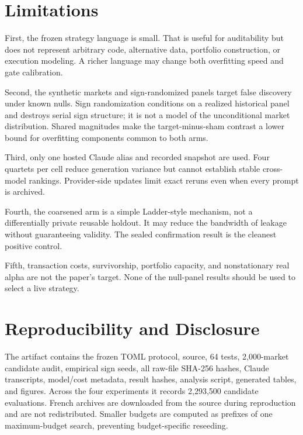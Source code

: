 \documentclass[sigconf,nonacm]{acmart}
\begin{document}
\section{Limitations}

First, the frozen strategy language is small. That is useful for auditability
but does not represent arbitrary code, alternative data, portfolio construction,
or execution modeling. A richer language may change both overfitting speed and
gate calibration.

Second, the synthetic markets and sign-randomized panels target false discovery
under known nulls. Sign randomization conditions on a realized historical panel
and destroys serial sign structure; it is not a model of the unconditional
market distribution. Shared magnitudes make the target-minus-sham contrast a
lower bound for overfitting components common to both arms.

Third, only one hosted Claude alias and recorded snapshot are used. Four
quartets per cell reduce generation variance but cannot establish stable
cross-model rankings. Provider-side updates limit exact reruns even when every
prompt is archived.

Fourth, the coarsened arm is a simple Ladder-style mechanism, not a differentially
private reusable holdout. It may reduce the bandwidth of leakage without
guaranteeing validity. The sealed confirmation result is the cleanest positive
control.

Fifth, transaction costs, survivorship, portfolio capacity, and nonstationary
real alpha are not the paper's target. None of the null-panel results should be
used to select a live strategy.

\section{Reproducibility and Disclosure}

The artifact contains the frozen TOML protocol, source, 64 tests, 2,000-market
candidate audit, empirical sign seeds, all raw-file SHA-256 hashes, Claude
transcripts, model/cost metadata, result hashes, analysis script, generated
tables, and figures. Across the four experiments it records 2,293,500 candidate
evaluations. French archives are downloaded from the source during
reproduction and are not redistributed. Smaller budgets are computed as
prefixes of one maximum-budget search, preventing budget-specific reseeding.
\end{document}

